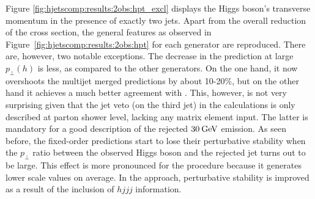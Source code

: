 Figure \ref{fig:hjetscomp:results:2obs:hpt_excl} displays the 
Higgs boson's transverse momentum in the presence of exactly two jets. 
Apart from the overall reduction of the cross section, the general 
features as observed in Figure~\ref{fig:hjetscomp:results:2obs:hpt}
for each generator are reproduced. There are, however, two notable
exceptions. The decrease in the \Powheg \NNLOPS prediction at large $p_\perp(h)$ 
is less, as compared to
the other generators. On the one hand, it now overshoots the multijet
merged predictions by about 10-20\%, but on the other hand it achieves
a much better agreement with \Sherpa \NNLOPS. This, however, is not
very surprising given that the jet veto (on the third jet) in the
\NNLOPS calculations is only described at parton shower level, lacking
any matrix element input. The latter is mandatory for a good
description of the rejected $30\text{\:GeV}$ emission. As seen before, the
fixed-order predictions start to lose their perturbative stability when
the $p_\perp$ ratio between the observed Higgs boson and the rejected
jet turns out to be large. This effect is more pronounced for the
\Minlo procedure because it generates lower scale values on
average. In the \Loopsim approach, perturbative stability is
improved as a result of the inclusion of $hjjj$ information.

